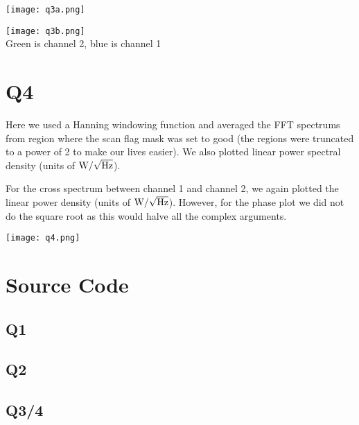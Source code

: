 \documentclass[12pt]{article}
\begin{document}
\begin{center}
\texttt{[image: q3a.png]}
\end{center}
\begin{center}
\texttt{[image: q3b.png]}\\
Green is channel 2, blue is channel 1 
\end{center}


\section{Q4}
Here we used a Hanning windowing function and averaged the FFT spectrums from region where the scan flag mask was set to good (the regions were truncated to a power of 2 to make our lives easier). We also plotted linear power spectral density (units of $\textnormal{W}/\sqrt{\textnormal{Hz}}$).

For the cross spectrum between channel 1 and channel 2, we again plotted the linear power density (units of $\textnormal{W}/\sqrt{\textnormal{Hz}}$). However, for the phase plot we did not do the square root as this would halve all the complex arguments.
\begin{center}
\texttt{[image: q4.png]}
\end{center}

\section{Source Code}
\subsection{Q1}

\subsection{Q2}

\subsection{Q3/4}

\end{document}
